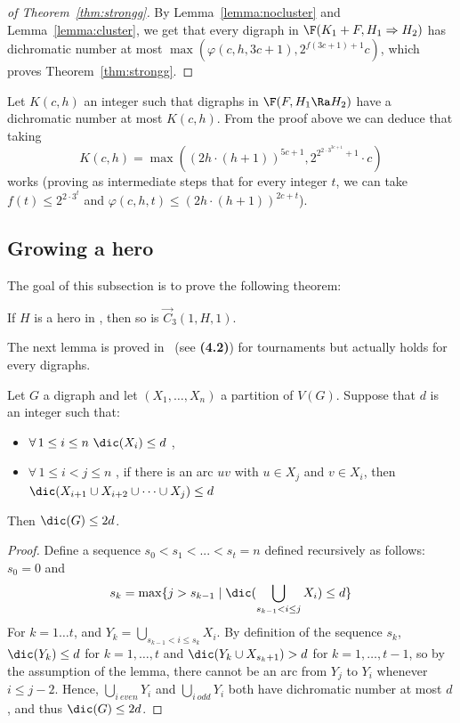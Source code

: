 \begin{proof}[of Theorem~\ref{thm:strongg}]
By Lemma~\ref{lemma:nocluster} and Lemma~\ref{lemma:cluster}, we get that every digraph in $\F( K_1+F, H_{1} \Rightarrow H_{2})$ has dichromatic number at most $\max(\varphi(c,h,3c+1),2^{f(3c+1)+1} c)$, which proves Theorem~\ref{thm:strongg}.
\end{proof}



\begin{remark}
Let $K(c,h)$ an integer such that digraphs in $\F( F, H_1 \Ra H_2)$ have a dichromatic number at most $K(c,h)$. From the proof above we can deduce that taking 
$$K(c,h)=\max( (2h \cdot (h+1))^{5c+1} , 2 ^ {2 ^ {2 \cdot 3^{3c + 1}} + 1} \cdot c)$$ %
works (proving as intermediate steps that for every integer $t$, we can take $f(t) \leq 2 ^ {2 \cdot 3^t}$ and $\varphi(c,h,t) \leq (2h \cdot (h+1))^{2c + t}$).
\end{remark}


\subsection{Growing a hero}\label{subsec:growing_heroes}

The goal of this subsection is to prove the following theorem:  
\begin{theorem}\label{thm:delta}
If $H$ is a hero in \omgs, then so is $\vec C_{3}(1, H, 1)$. 
\end{theorem}

The next lemma is proved in~\cite{hero} (see \textbf{(4.2)}) for tournaments but actually holds for every digraphs. 
\begin{lemma}\label{lem:backedge}
Let $G$ a digraph and let $(X_1, \dots, X_n)$ a partition of $V(G)$. Suppose that $d$ is an integer such that:
\begin{itemize}
    \item $\forall\, 1 \leq i \leq n\ \dic(X_i) \leq d$ , %
    \item $\forall\, 1 \leq i < j  \leq n$ , if there is an arc $uv$ with $u \in X_j$ and $v \in X_i$, then $ \dic(X_{i+1} \cup X_{i+2} \cup \dots \cup X_j) \leq d $
\end{itemize}
Then $\dic(G) \leq 2d$. 
\end{lemma}

\begin{proof}
Define a sequence $s_0<s_1<...<s_t=n$ defined recursively as follows: $s_0=0$ and 
$$s_{k}=\max\{ j>s_{k-1} \mid \dic(\bigcup_{s_{k-1} < i \leq j} X_i)\leq  d \}$$
For $k=1\ldots t$,  and  $Y_k=\bigcup_{s_{k-1} < i \leq s_k} X_i$. 
By definition of the sequence $s_k$, $\dic(Y_k)\leq d$ for $k=1, \dots, t$ and $\dic(Y_k\cup X_{s_k+1})>d$ for $k=1, \dots, t-1$, so by the assumption of the lemma, there cannot be an arc from $Y_j$ to $Y_i$ whenever $i \leq j-2$.  Hence, $\bigcup_{i\ even} Y_i$ and $\bigcup_{i\ odd}Y_i$ both have dichromatic number at most $d$, and thus $\dic(G) \leq 2d$. 
\end{proof}


